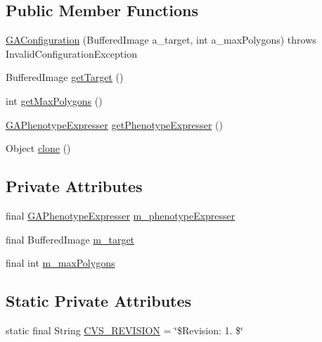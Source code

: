 \subsection*{Public Member Functions}
\begin{DoxyCompactItemize}
\item 
\hyperlink{classexamples_1_1monalisa_1_1core_1_1_g_a_configuration_ac604124a1bb6b03b6a6912fdb68fd2b6}{G\-A\-Configuration} (Buffered\-Image a\-\_\-target, int a\-\_\-max\-Polygons)  throws Invalid\-Configuration\-Exception 
\item 
Buffered\-Image \hyperlink{classexamples_1_1monalisa_1_1core_1_1_g_a_configuration_a347afff4b70dee422b1428ce8d32bbf6}{get\-Target} ()
\item 
int \hyperlink{classexamples_1_1monalisa_1_1core_1_1_g_a_configuration_a3f5de2b0a9fdc47ca557c4c0970be213}{get\-Max\-Polygons} ()
\item 
\hyperlink{classexamples_1_1monalisa_1_1core_1_1_g_a_phenotype_expresser}{G\-A\-Phenotype\-Expresser} \hyperlink{classexamples_1_1monalisa_1_1core_1_1_g_a_configuration_a9ecd0d5dc6918a24b88eaf759ab47319}{get\-Phenotype\-Expresser} ()
\item 
Object \hyperlink{classexamples_1_1monalisa_1_1core_1_1_g_a_configuration_a17d3af916b361723088234f60b9f4d67}{clone} ()
\end{DoxyCompactItemize}
\subsection*{Private Attributes}
\begin{DoxyCompactItemize}
\item 
final \hyperlink{classexamples_1_1monalisa_1_1core_1_1_g_a_phenotype_expresser}{G\-A\-Phenotype\-Expresser} \hyperlink{classexamples_1_1monalisa_1_1core_1_1_g_a_configuration_ace0ab91616134a8d26a2d6a4ff6e1237}{m\-\_\-phenotype\-Expresser}
\item 
final Buffered\-Image \hyperlink{classexamples_1_1monalisa_1_1core_1_1_g_a_configuration_a91d27add7f968f4256948bbc16c22e7a}{m\-\_\-target}
\item 
final int \hyperlink{classexamples_1_1monalisa_1_1core_1_1_g_a_configuration_ae59b653400e21a41a9fcde914a1bc6d9}{m\-\_\-max\-Polygons}
\end{DoxyCompactItemize}
\subsection*{Static Private Attributes}
\begin{DoxyCompactItemize}
\item 
static final String \hyperlink{classexamples_1_1monalisa_1_1core_1_1_g_a_configuration_a9b72d1966d087be2acdcc443db5ee2c6}{C\-V\-S\-\_\-\-R\-E\-V\-I\-S\-I\-O\-N} = \char`\"{}\$Revision\-: 1. \$\char`\"{}
\end{DoxyCompactItemize}


